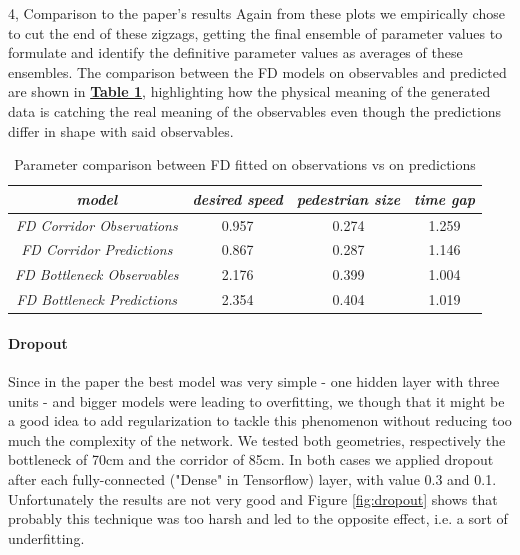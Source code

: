 \documentclass[10pt,a4paper]{article}
\begin{document}
\begin{task}{4, Comparison to the paper's results}
Again from these plots we empirically chose to cut the end of these zigzags, getting the final ensemble of parameter values to formulate and identify the definitive parameter values as averages of these ensembles. The comparison between the FD models on observables and predicted are shown in \textbf{\hyperref[tab:res-fd-comparison]{Table \ref{tab:res-fd-comparison}}}, highlighting how the physical meaning of the generated data is catching the real meaning of the observables even though the predictions differ in shape with said observables.

\begin{table}[H]
    \centering
    \begin{tabular}{|cccc|}
        \hline
        \textbf{\textit{model}} & \textbf{\textit{desired speed}} & \textbf{\textit{pedestrian size}} & \textbf{\textit{time gap}}\\
        \hline
        \hline
        \textit{FD Corridor Observations} & 0.957 & 0.274 & 1.259\\
        \hline
        \textit{FD Corridor Predictions} & 0.867 & 0.287 & 1.146\\
        \hline
        \hline
        \textit{FD Bottleneck Observables} & 2.176 & 0.399 & 1.004\\
        \hline
        \textit{FD Bottleneck Predictions} & 2.354 & 0.404 & 1.019\\
        \hline
    \end{tabular}
    \caption{Parameter comparison between FD fitted on observations vs on predictions}
    \label{tab:res-fd-comparison}
\end{table}

\paragraph{Dropout}
Since in the paper the best model was very simple - one hidden layer with three units - and bigger models were leading to overfitting, we though that it might be a good idea to add regularization to tackle this phenomenon without reducing too much the complexity of the network.
We tested both geometries, respectively the bottleneck of 70cm and the corridor of 85cm.
In both cases we applied dropout after each fully-connected ("Dense" in Tensorflow) layer, with value 0.3 and 0.1.
Unfortunately the results are not very good and Figure \ref{fig:dropout} shows that probably this technique was too harsh and led to the opposite effect, i.e. a sort of underfitting.


\end{task}
\end{document}
